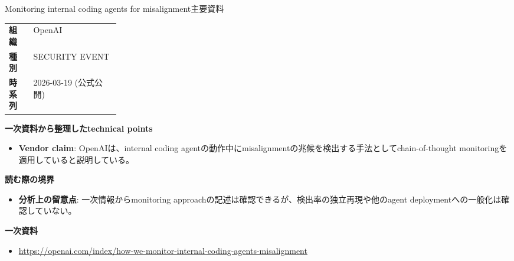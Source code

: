 \begin{technicalnote}{Monitoring internal coding agents for misalignment}{主要資料}
\begingroup
\begin{tabularx}{\linewidth}{@{}>{\bfseries}p{0.22\linewidth}X@{}}
組織 & OpenAI \\
種別 & SECURITY EVENT \\
時系列 & 2026-03-19 (公式公開) \\
\end{tabularx}
\smallskip
{\bfseries 一次資料から整理したtechnical points}
\begin{itemize}[leftmargin=1.5em,itemsep=0.35em]
\item \textbf{Vendor claim}: OpenAIは、internal coding agentの動作中にmisalignmentの兆候を検出する手法としてchain-of-thought monitoringを適用していると説明している。
\end{itemize}
\begin{minipage}{\linewidth}
{\bfseries 読む際の境界}
\begin{itemize}[leftmargin=1.5em,itemsep=0.35em]
\item \textbf{分析上の留意点}: 一次情報からmonitoring approachの記述は確認できるが、検出率の独立再現や他のagent deploymentへの一般化は確認していない。
\end{itemize}
\begin{samepage}
{\bfseries 一次資料}
\begingroup\sloppy
\begin{itemize}[leftmargin=1.5em,itemsep=0.25em]
\item {\scriptsize\url{https://openai.com/index/how-we-monitor-internal-coding-agents-misalignment}}
\end{itemize}
\endgroup
\end{samepage}
\end{minipage}
\endgroup
\end{technicalnote}
\medskip

